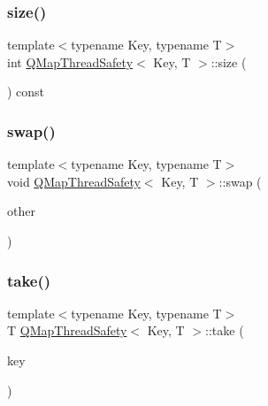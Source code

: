 \subsubsection{\texorpdfstring{size()}{size()}}
{\footnotesize\ttfamily template$<$typename Key, typename T$>$ \\
int \hyperlink{class_q_map_thread_safety}{Q\+Map\+Thread\+Safety}$<$ Key, T $>$\+::size (\begin{DoxyParamCaption}{ }\end{DoxyParamCaption}) const\hspace{0.3cm}{\ttfamily [inline]}}

\mbox{\label{class_q_map_thread_safety_addcefa9985e7fa96939eca2a8e2b1fcc}} 
\subsubsection{\texorpdfstring{swap()}{swap()}}
{\footnotesize\ttfamily template$<$typename Key, typename T$>$ \\
void \hyperlink{class_q_map_thread_safety}{Q\+Map\+Thread\+Safety}$<$ Key, T $>$\+::swap (\begin{DoxyParamCaption}\item[{Q\+Map$<$ Key, T $>$ \&}]{other }\end{DoxyParamCaption})\hspace{0.3cm}{\ttfamily [inline]}}

\mbox{\label{class_q_map_thread_safety_a03f5056559f4d0f2500ddcb8ddf55098}} 
\subsubsection{\texorpdfstring{take()}{take()}}
{\footnotesize\ttfamily template$<$typename Key, typename T$>$ \\
T \hyperlink{class_q_map_thread_safety}{Q\+Map\+Thread\+Safety}$<$ Key, T $>$\+::take (\begin{DoxyParamCaption}\item[{const Key \&}]{key }\end{DoxyParamCaption})\hspace{0.3cm}{\ttfamily [inline]}}

